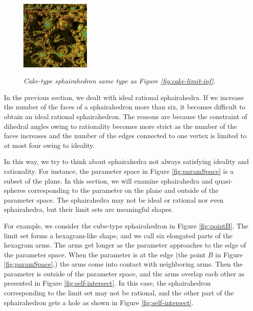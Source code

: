 \begin{figure}[h!tbp]
\begin{minipage}[t]{0.5\textwidth}
\begin{minipage}[t]{0.24\textwidth}
   \label{fig:cake-sphairahedron-broken}
  \end{minipage}
  \hspace*{\fill}
  \begin{minipage}[t]{0.24\textwidth}
   \centering
   \includegraphics[width=1.35in, height=1.35in, keepaspectratio]{./img/application/sphairahedron/breakingIdealityOrRationality/limit1228.jpg}
   \label{fig:cake-limit-broken}
  \end{minipage}
  \hspace*{\fill}
  \caption{\textit{Cake-type sphairahedron same type as Figure \ref{fig:cake-limit-inf}.}}
  \label{fig:broken-sphairahedron}
 \end{minipage}
\end{figure}

\noindent
In the previous section, we dealt with ideal rational sphairahedra.
If we increase the number of the faces of a sphairahedron more than
six, it becomes difficult to obtain an ideal rational sphairahedron.
The reasons are because the constraint of dihedral angles owing to
rationality becomes more strict as the number of the faces increases
and the number of the edges connected to one vertex
is limited to at most four owing to ideality.

In this way, we try to think about sphairahedra not always satisfying
ideality and rationality.
For instance, the parameter space in Figure \ref{fig:paramSpace}
is a subset of the plane.
In this section, we will examine sphairahedra and quasi-spheres
corresponding to the parameter on the plane and outside of the
parameter space.
The sphairahedra may not be ideal or rational nor even sphairahedra, but
their limit sets are meaningful shapes.

For example, we consider the cube-type sphairahedron in Figure \ref{fig:pointB}.
The limit set forms a hexagram-like shape, and we call six elongated parts
of the hexagram arms.
The arms get longer as the parameter approaches to the edge of the
parameter space.
When the parameter is at the edge (the point $B$ in Figure \ref{fig:paramSpace},)
the arms come into contact with neighboring arms.
Then the parameter is outside of the parameter space, and the arms
overlap each other as presented in Figure
\ref{fig:self-intersect}.
In this case, the sphairahedron corresponding to the limit set
may not be rational, and the other part of the sphairahedron gets a hole
as shown in Figure \ref{fig:self-intersect}.

